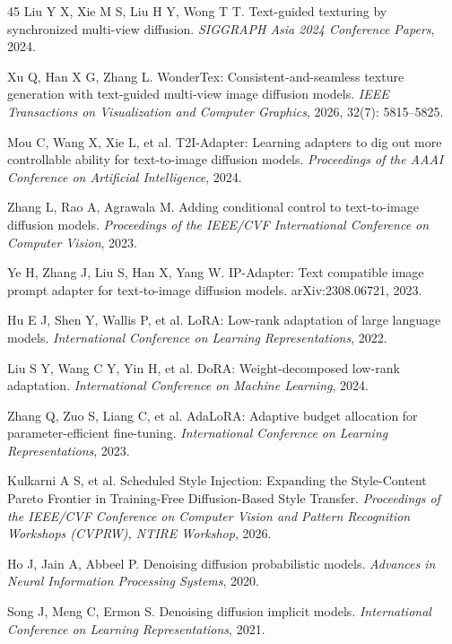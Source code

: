 \documentclass[times,twocolumn,final]{elsarticle}
\providecommand{\DIFadd}[1]{{\protect\color{blue} \sf #1}} %
\providecommand{\DIFaddbegin}{} %
\providecommand{\DIFaddend}{} %
\begin{document}
\begin{thebibliography}{45}
\DIFaddend {}
Liu Y X, Xie M S, Liu H Y, Wong T T. Text-guided texturing by synchronized multi-view diffusion. \textit{SIGGRAPH Asia 2024 Conference Papers}, 2024.

Xu Q, Han X G, Zhang L. WonderTex: Consistent-and-seamless texture generation with text-guided multi-view image diffusion models. \textit{IEEE Transactions on Visualization and Computer Graphics}, 2026, 32(7): 5815--5825.

Mou C, Wang X, Xie L, et al. T2I-Adapter: Learning adapters to dig out more controllable ability for text-to-image diffusion models. \textit{Proceedings of the AAAI Conference on Artificial Intelligence}, 2024.

Zhang L, Rao A, Agrawala M. Adding conditional control to text-to-image diffusion models. \textit{Proceedings of the IEEE/CVF International Conference on Computer Vision}, 2023.

Ye H, Zhang J, Liu S, Han X, Yang W. IP-Adapter: Text compatible image prompt adapter for text-to-image diffusion models. arXiv:2308.06721, 2023.

Hu E J, Shen Y, Wallis P, et al. LoRA: Low-rank adaptation of large language models. \textit{International Conference on Learning Representations}, 2022.

Liu S Y, Wang C Y, Yin H, et al. DoRA: Weight-decomposed low-rank adaptation. \textit{International Conference on Machine Learning}, 2024.

Zhang Q, Zuo S, Liang C, et al. AdaLoRA: Adaptive budget allocation for parameter-efficient fine-tuning. \textit{International Conference on Learning Representations}, 2023.

\DIFaddbegin {}
\DIFadd{Kulkarni A S, et al. Scheduled Style Injection: Expanding the Style-Content Pareto Frontier in Training-Free Diffusion-Based Style Transfer. \textit{Proceedings of the IEEE/CVF Conference on Computer Vision and Pattern Recognition Workshops (CVPRW), NTIRE Workshop}, 2026.
}

\DIFaddend {}
Ho J, Jain A, Abbeel P. Denoising diffusion probabilistic models. \textit{Advances in Neural Information Processing Systems}, 2020.

Song J, Meng C, Ermon S. Denoising diffusion implicit models. \textit{International Conference on Learning Representations}, 2021.


\end{thebibliography}
\end{document}
